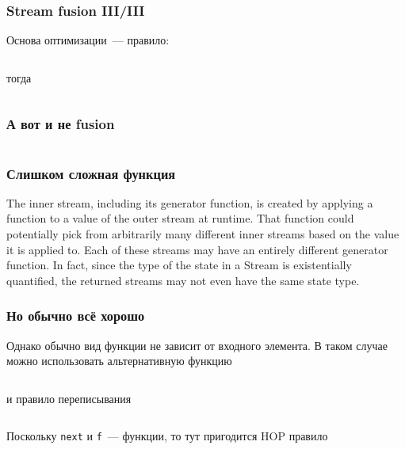 \documentclass[
    aspectratio=169,
]{beamer}
\begin{document}
\begin{frame}
    \frametitle{Stream fusion III/III}

    Основа оптимизации~--- правило:
    \inputminted[firstline=161, lastline=161]{text}{Code.hs}

    тогда
    \inputminted[firstline=163, lastline=168]{haskell}{Code.hs}

\end{frame}

\begin{frame}
    \frametitle{А вот и не fusion}

    \inputminted[firstline=170, lastline=183]{haskell}{Code.hs}

\end{frame}

\begin{frame}
    \frametitle{Слишком сложная функция}

    \begin{displayquote}
        The inner stream, including its generator function, is created by applying a function to a value of the outer stream at runtime. That function could potentially pick from arbitrarily many different inner streams based on the value it is applied to. Each of these streams may have an entirely different generator function. In fact, since the type of the state in a Stream is existentially quantified, the returned streams may not even have the same state type.
    \end{displayquote}

\end{frame}

\begin{frame}
    \frametitle{Но обычно всё хорошо}

    Однако обычно вид функции не зависит от входного элемента.
    В таком случае можно использовать альтернативную функцию
    \inputminted[firstline=185, lastline=185]{haskell}{Code.hs}

    \vspace{1em}
    и правило переписывания
    \inputminted[firstline=187, lastline=190]{text}{Code.hs}

    Поскольку \texttt{next} и \texttt{f}~--- функции, то тут пригодится HOP правило
\end{frame}
\end{document}
